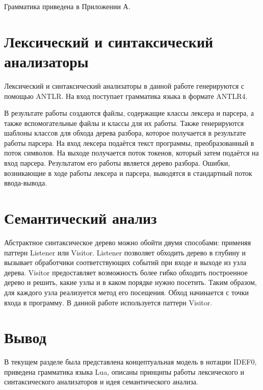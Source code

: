 Грамматика приведена в Приложении А.

\section{Лексический и синтаксический анализаторы}

Лексический и синтаксический анализаторы в данной работе генерируются с помощью ANTLR. 
На вход поступает грамматика языка в формате ANTLR4.

В результате работы создаются файлы, содержащие классы лексера и парсера, а также вспомогательные файлы и классы для их работы. 
Также генерируются шаблоны классов для обхода дерева разбора, которое получается в результате работы парсера.
На вход лексера подаётся текст программы, преобразованный в поток символов. 
На выходе получается поток токенов, который затем подаётся на вход парсера.
Результатом его работы является дерево разбора.
Ошибки, возникающие в ходе работы лексера и парсера, выводятся в стандартный поток ввода-вывода.

\section{Семантический анализ}

Абстрактное синтаксическое дерево можно обойти двумя способами: применяя паттерн Listener или Visitor.
Listener позволяет обходить дерево в глубину и вызывает обработчики соответствующих событий при входе и выходе из узла дерева.
Visitor предоставляет возможность более гибко обходить построенное дерево и решить, какие узлы и в каком порядке нужно посетить. 
Таким образом, для каждого узла реализуется метод его посещения. Обход начинается с точки входа в программу.
В данной работе используется паттерн Visitor.

\section{Вывод}

В текущем разделе была представлена концептуальная модель в нотации IDEF0, приведена грамматика языка Lua, описаны принципы работы лексического и синтаксического анализаторов и идея семантического анализа.
